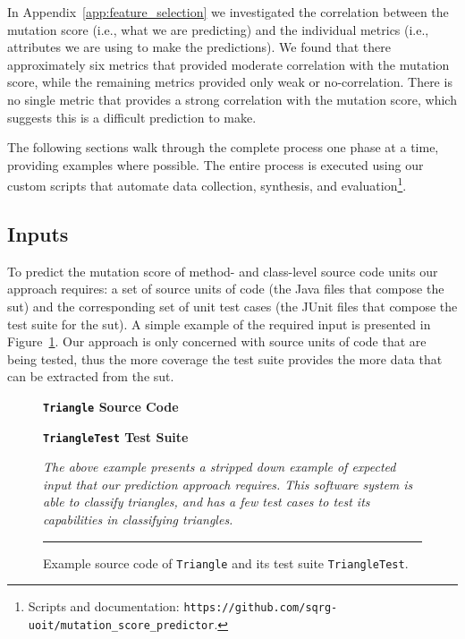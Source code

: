 In Appendix~\ref{app:feature_selection} we investigated the correlation between the mutation score (i.e., what we are predicting) and the individual metrics (i.e., attributes we are using to make the predictions). We found that there approximately six metrics that provided moderate correlation with the mutation score, while the remaining metrics provided only weak or no-correlation. There is no single metric that provides a strong correlation with the mutation score, which suggests this is a difficult prediction to make.

The following sections walk through the complete process one phase at a time, providing examples where possible. The entire process is executed using our custom scripts that automate data collection, synthesis, and evaluation\footnote{Scripts and documentation: \texttt{https://github.com/sqrg-uoit/mutation\_score\_predictor}.}.


\subsection{Inputs}
\label{subsec:approach_inputs}
To predict the mutation score of method- and class-level source code units our approach requires: a set of source units of code (the Java files that compose the \gls{sut}) and the corresponding set of unit test cases (the JUnit files that compose the test suite for the \gls{sut}). A simple example of the required input is presented in Figure~\ref{fig:triangle_example}. Our approach is only concerned with source units of code that are being tested, thus the more coverage the test suite provides the more data that can be extracted from the \gls{sut}.

\begin{figure}[!tb]
  \centering
  \begin{minipage}[t]{7.25cm}
  \centering
  \footnotesize{\textbf{\texttt{Triangle} Source Code}}
  
  \end{minipage}
  \hfill
  \begin{minipage}[t]{7.25cm}
  \centering
  \footnotesize{\textbf{\texttt{TriangleTest} Test Suite}}
  
  \end{minipage}
  \caption{Example source code of \texttt{Triangle} and its test suite \texttt{TriangleTest}.}
  \vspace{1mm}
  \footnotesize{\emph{The above example presents a stripped down example of expected input that our prediction approach requires. This software system is able to classify triangles, and has a few test cases to test its capabilities in classifying triangles.}}
  \vspace{2mm}
  \hrule
  \label{fig:triangle_example}
\end{figure}


